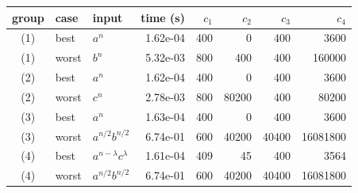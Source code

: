 \begin{tabular}{cllrrrrr}
\toprule
group & case & input & time (s) & $c_1$ & $c_2$ & $c_3$ & $c_4$ \\ \midrule
(1) & best & $a^{n}$ & 1.62e-04 & 400 & 0 & 400 & 3600 \\
(1) & worst & $b^{n}$ & 5.32e-03 & 800 & 400 & 400 & 160000 \\
(2) & best & $a^{n}$ & 1.62e-04 & 400 & 0 & 400 & 3600 \\
(2) & worst & $c^{n}$ & 2.78e-03 & 800 & 80200 & 400 & 80200 \\
(3) & best & $a^{n}$ & 1.63e-04 & 400 & 0 & 400 & 3600 \\
(3) & worst & $a^{n/2}b^{n/2}$ & 6.74e-01 & 600 & 40200 & 40400 & 16081800 \\
(4) & best & $a^{n-\lambda}c^{\lambda}$ & 1.61e-04 & 409 & 45 & 400 & 3564 \\
(4) & worst & $a^{n/2}b^{n/2}$ & 6.74e-01 & 600 & 40200 & 40400 & 16081800 \\
\bottomrule
\end{tabular}
